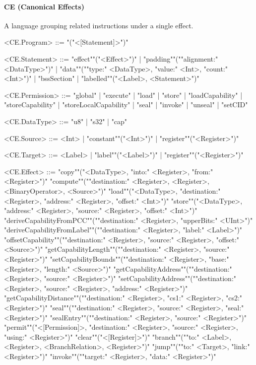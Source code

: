 \documentclass[main.tex]{subfiles}
\begin{document}
\paragraph{ CE (Canonical Effects) } A language grouping related instructions under a single effect.
\begin{grammar}
	\footnotesize
				<CE.Program> ::=
							"("<[Statement]>")"
				\par
				<CE.Statement> ::=
						"effect""("<Effect>")"
						| "padding""(""alignment:" <DataType>")"
						| "data""(""type:" <DataType>, "value:" <Int>, "count:" <Int>")"
						| "bssSection"
						| "labelled""("<Label>, <Statement>")"
				\par
				<CE.Permission> ::=
						"global"
						| "execute"
						| "load"
						| "store"
						| "loadCapability"
						| "storeCapability"
						| "storeLocalCapability"
						| "seal"
						| "invoke"
						| "unseal"
						| "setCID"
				\par
				<CE.DataType> ::=
						"u8"
						| "s32"
						| "cap"
				\par
				<CE.Source> ::=
						<Int> |
						"constant""("<Int>")"
						| "register""("<Register>")"
				\par
				<CE.Target> ::=
								<Label> |
						"label""("<Label>")"
						| "register""("<Register>")"
				\par
				<CE.Effect> ::=
						"copy""("<DataType>, "into:" <Register>, "from:" <Register>")"
						\alt "compute""(""destination:" <Register>, <Register>, <BinaryOperator>, <Source>")"
						\alt "load""("<DataType>, "destination:" <Register>, "address:" <Register>, "offset:" <Int>")"
						\alt "store""("<DataType>, "address:" <Register>, "source:" <Register>, "offset:" <Int>")"
						\alt "deriveCapabilityFromPCC""(""destination:" <Register>, "upperBits:" <UInt>")"
						\alt "deriveCapabilityFromLabel""(""destination:" <Register>, "label:" <Label>")"
						\alt "offsetCapability""(""destination:" <Register>, "source:" <Register>, "offset:" <Source>")"
						\alt "getCapabilityLength""(""destination:" <Register>, "source:" <Register>")"
						\alt "setCapabilityBounds""(""destination:" <Register>, "base:" <Register>, "length:" <Source>")"
						\alt "getCapabilityAddress""(""destination:" <Register>, "source:" <Register>")"
						\alt "setCapabilityAddress""(""destination:" <Register>, "source:" <Register>, "address:" <Register>")"
						\alt "getCapabilityDistance""(""destination:" <Register>, "cs1:" <Register>, "cs2:" <Register>")"
						\alt "seal""(""destination:" <Register>, "source:" <Register>, "seal:" <Register>")"
						\alt "sealEntry""(""destination:" <Register>, "source:" <Register>")"
						\alt "permit""("<[Permission]>, "destination:" <Register>, "source:" <Register>, "using:" <Register>")"
						\alt "clear""("<[Register]>")"
						\alt "branch""(""to:" <Label>, <Register>, <BranchRelation>, <Register>")"
						\alt "jump""(""to:" <Target>, "link:" <Register>")"
						\alt "invoke""(""target:" <Register>, "data:" <Register>")"
				\par
\end{grammar}
\par
\end{document}
